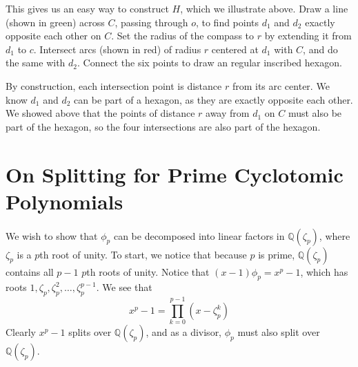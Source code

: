 \documentclass[12pt]{article}
\newcommand*{\Q}{\mathbb{Q}}
\begin{document}
\begin{figure}[H] \centering
{}
\end{figure}

This gives us an easy way to construct $H$, which we illustrate above. Draw a line (shown in green) across $C$, passing through $o$, to find points $d_1$ and $d_2$ exactly opposite each other on $C$. Set the radius of the compass to $r$ by extending it from $d_1$ to $c$. Intersect arcs (shown in red) of radius $r$ centered at $d_1$ with $C$, and do the same with $d_2$. Connect the six points to draw an regular inscribed hexagon.

By construction, each intersection point is distance $r$ from its arc center. We know $d_1$ and $d_2$ can be part of a hexagon, as they are exactly opposite each other. We showed above that the points of distance $r$ away from $d_1$ on $C$ must also be part of the hexagon, so the four intersections are also part of the hexagon. 

\section{On Splitting for Prime Cyclotomic Polynomials}
We wish to show that $\phi_p$ can be decomposed into linear factors in $\Q(\zeta_p)$, where $\zeta_p$ is a $p$th root of unity. To start, we notice that because $p$ is prime, $\Q(\zeta_p)$ contains all $p - 1$ $p$th roots of unity. Notice that $(x - 1)\phi_p = x^p - 1$, which has roots $1, \zeta_p, \zeta_p^2,\ldots,\zeta_p^{p - 1}$. We see that
\[ x ^ p - 1 = \prod_{k = 0}^{p - 1} (x - \zeta_p ^ k) \]
Clearly $x^p - 1$ splits over $\Q(\zeta_p)$, and as a divisor, $\phi_p$ must also split over $\Q(\zeta_p)$.
\end{document}
